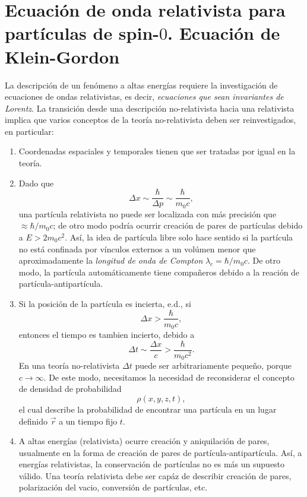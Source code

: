 \section{Ecuación de onda relativista para partículas de spin-$0$. Ecuación de Klein-Gordon}

La descripción de un fenómeno a altas energías requiere la investigación de ecuaciones de ondas relativistas, es decir, \textit{ecuaciones que sean invariantes de Lorentz}. La transición desde una descripción no-relativista hacia una relativista implica que varios conceptos de la teoría no-relativista deben ser reinvestigados, en particular:
\begin{enumerate}
	\item Coordenadas espaciales y temporales tienen que ser tratadas por igual en la teoría.
	\item Dado que
	\begin{equation}
  \Delta x\sim \frac{\hbar}{\Delta p}\sim \frac{\hbar }{m_0c},
\end{equation}
una partícula relativista no puede ser localizada con más precisión que $\approx \hbar/m_0c$; de otro modo podría ocurrir creación de pares de partículas debido a $E>2m_0c^2$. Así, la idea de partícula libre solo hace sentido si la partícula no está confinada por vínculos externos a un volúmen menor que aproximadamente la \textit{longitud de onda de Compton} $\lambda_{ c}=\hbar/m_0c $. De otro modo, la partícula automáticamente tiene compañeros debido a la reación de partícula-antipartícula.
\item Si la posición de la partícula es incierta, e.d., si
\begin{equation}
  \Delta x>\frac{\hbar }{m_0c},
\end{equation}
entonces el tiempo es tambien incierto, debido a
\begin{equation}
  \Delta t\sim \frac{\Delta x}{c}>\frac{\hbar}{m_0c^2}.
\end{equation}
En una teoría no-relativista $\Delta t$ puede ser arbitrariamente pequeño, porque $c\to \infty$. De este modo, necesitamos la necesidad de reconsiderar el concepto de densidad de probabilidad
\begin{equation}
  \rho(x,y,z,t),
\end{equation}
el cual describe la probabilidad de encontrar una partícula en un lugar definido $\vec{r}$ a un tiempo fijo $t$.
\item A altas energías (relativista) ocurre creación y aniquilación de pares, usualmente en la forma de creación de pares de partícula-antipartícula. Así, a energías relativistas, la conservación de partículas no es más un supuesto válido. Una teoría relativista debe ser capáz de describir creación de pares, polarización del vacio, conversión de partículas, etc. 
\end{enumerate}

